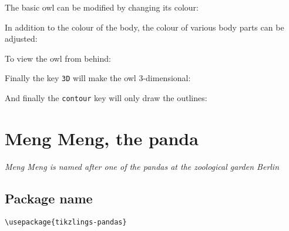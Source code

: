 \documentclass[parskip=half]{scrartcl}
\begin{document}
The basic owl can be modified by changing its colour:
\begin{tcblisting}{}
\owl[body=blue]
\end{tcblisting}

In addition to the colour of the body, the colour of various body parts can be adjusted:
\begin{tcblisting}{}
\owl[eye=red]
\end{tcblisting}
\begin{tcblisting}{}
\owl[pupil=red]
\end{tcblisting}
\begin{tcblisting}{}
\owl[bill=red]
\end{tcblisting}
\begin{tcblisting}{}
\owl[feet=red]
\end{tcblisting}

To view the owl from behind:
\begin{tcblisting}{}
\owl[back]
\end{tcblisting}

Finally the key \lstinline|3D| will make the owl 3-dimensional:
\begin{tcblisting}{}
\owl[3D]
\end{tcblisting}

And finally the \lstinline|contour| key will only draw the outlines:
\begin{tcblisting}{}
\owl[contour=black]
\end{tcblisting}

%
%
\clearpage
\section[Panda]{Meng Meng, the panda}

\emph{Meng Meng is named after one of the pandas at the zoological garden Berlin}

\subsection{Package name}

\begin{tcolorbox}[lower separated=false, lefthand width=.8\linewidth]
\vspace*{0.5cm}
\lstinline|\usepackage{tikzlings-pandas}| 
\vspace*{0.5cm}
\end{tcolorbox}
\end{document}
